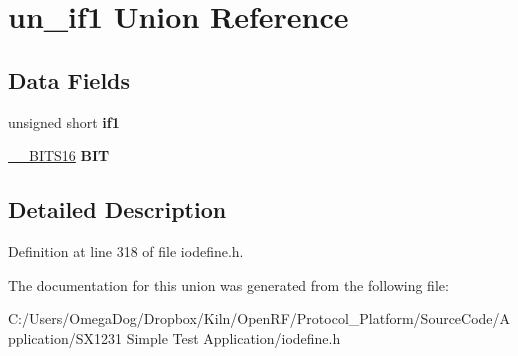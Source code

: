 \hypertarget{unionun__if1}{\section{un\-\_\-if1 Union Reference}
\label{unionun__if1}
}
\subsection*{Data Fields}
\begin{DoxyCompactItemize}
\item 
\hypertarget{unionun__if1_aec0ef48f50866b28644101cfceb35688}{unsigned short {\bfseries if1}}\label{unionun__if1_aec0ef48f50866b28644101cfceb35688}

\item 
\hypertarget{unionun__if1_ae4443f8a759aad8bf80014fa10a15a05}{\hyperlink{struct_____b_i_t_s16}{\-\_\-\-\_\-\-B\-I\-T\-S16} {\bfseries B\-I\-T}}\label{unionun__if1_ae4443f8a759aad8bf80014fa10a15a05}

\end{DoxyCompactItemize}


\subsection{Detailed Description}


Definition at line 318 of file iodefine.\-h.



The documentation for this union was generated from the following file\-:\begin{DoxyCompactItemize}
\item 
C\-:/\-Users/\-Omega\-Dog/\-Dropbox/\-Kiln/\-Open\-R\-F/\-Protocol\-\_\-\-Platform/\-Source\-Code/\-Application/\-S\-X1231 Simple Test Application/iodefine.\-h\end{DoxyCompactItemize}
